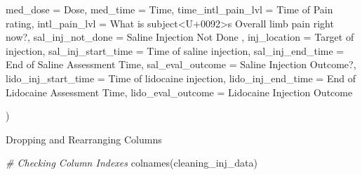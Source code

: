 \documentclass[
]{article}
\newenvironment{Shaded}{\begin{snugshade}}{\end{snugshade}}
\newcommand{\AttributeTok}[1]{\textcolor[rgb]{0.77,0.63,0.00}{#1}}
\newcommand{\CommentTok}[1]{\textcolor[rgb]{0.56,0.35,0.01}{\textit{#1}}}
\newcommand{\FunctionTok}[1]{\textcolor[rgb]{0.00,0.00,0.00}{#1}}
\newcommand{\NormalTok}[1]{#1}
\newcommand{\StringTok}[1]{\textcolor[rgb]{0.31,0.60,0.02}{#1}}
\begin{document}
\begin{Shaded}
\begin{Highlighting}[]
         \AttributeTok{med\_dose            =}\NormalTok{ Dose,}
         \AttributeTok{med\_time            =}\NormalTok{ Time,}
         \AttributeTok{time\_intl\_pain\_lvl  =} \StringTok{\textasciigrave{}}\AttributeTok{Time of Pain rating}\StringTok{\textasciigrave{}}\NormalTok{,}
         \AttributeTok{intl\_pain\_lvl       =} \StringTok{\textasciigrave{}}\AttributeTok{What is subject\textless{}U+0092\textgreater{}s Overall limb pain right now?}\StringTok{\textasciigrave{}}\NormalTok{,}
         \AttributeTok{sal\_inj\_not\_done    =} \StringTok{\textasciigrave{}}\AttributeTok{Saline Injection Not Done}\StringTok{\textasciigrave{}}\NormalTok{ ,}
         \AttributeTok{inj\_location        =} \StringTok{\textasciigrave{}}\AttributeTok{Target of injection}\StringTok{\textasciigrave{}}\NormalTok{,}
         \AttributeTok{sal\_inj\_start\_time  =} \StringTok{\textasciigrave{}}\AttributeTok{Time of saline injection}\StringTok{\textasciigrave{}}\NormalTok{,}
         \AttributeTok{sal\_inj\_end\_time    =} \StringTok{\textasciigrave{}}\AttributeTok{End of Saline Assessment Time}\StringTok{\textasciigrave{}}\NormalTok{,}
         \AttributeTok{sal\_eval\_outcome    =} \StringTok{\textasciigrave{}}\AttributeTok{Saline Injection Outcome?}\StringTok{\textasciigrave{}}\NormalTok{,}
         \AttributeTok{lido\_inj\_start\_time =} \StringTok{\textasciigrave{}}\AttributeTok{Time of lidocaine injection}\StringTok{\textasciigrave{}}\NormalTok{,}
         \AttributeTok{lido\_inj\_end\_time   =} \StringTok{\textasciigrave{}}\AttributeTok{End of Lidocaine Assessment Time}\StringTok{\textasciigrave{}}\NormalTok{,}
         \AttributeTok{lido\_eval\_outcome   =} \StringTok{\textasciigrave{}}\AttributeTok{Lidocaine Injection Outcome}\StringTok{\textasciigrave{}} 
         
\NormalTok{         )}
\end{Highlighting}
\end{Shaded}

Dropping and Rearranging Columns

\begin{Shaded}
\begin{Highlighting}[]
\CommentTok{\# Checking Column Indexes}
\FunctionTok{colnames}\NormalTok{(cleaning\_inj\_data)}
\end{Highlighting}
\end{Shaded}
\end{document}
